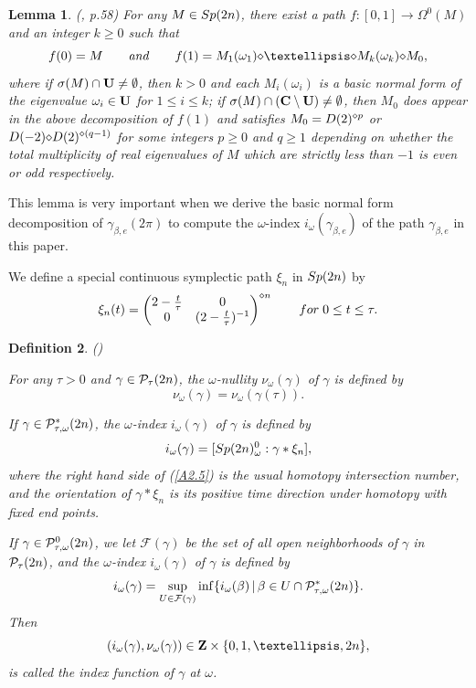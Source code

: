 \documentclass[11pt]{article}
\newtheorem{lemma}{Lemma}[section]
\newtheorem{definition}[lemma]{Definition}
\def\be{\begin{equation}}
\def\ee{\end{equation}}
\def\lb{\label}
\def\bs{\setminus}
\def\C{{\bf C}}
\def\Z{{\bf Z}}
\def\U{{\bf U}}
\def\bb{{\beta}}
\def\ga{{\gamma}}
\def\om{{\omega}}
\def\sg{{\sigma}}
\def\P{{\cal P}}
\def\Sp{{\rm Sp}}
\def\dm{{\rm \diamond}}
\begin{document}
\begin{lemma} (\cite{Lon4}, p.58) For any $M\in\Sp(2n)$, there exist a path $f:[0,1]\to\Omega^0(M)$ and
an integer $k\ge 0$ such that
$$ f(0)=M \qquad {\it and}\qquad f(1)=M_1(\om_1)\dm\ldots\dm M_k(\om_k)\dm M_0, $$
where if $\sg(M)\cap\U\not=\emptyset$, then $k>0$ and each $M_i(\om_i)$ is a basic normal form of the
eigenvalue $\om_i\in\U$ for $1\le i\le k$;
if $\sg(M)\cap (\C\bs\U)\not=\emptyset$, then $M_0$
does appear in the above decomposition of $f(1)$ and satisfies $M_0=D(2)^{\dm p}$ or
$D(-2)\dm D(2)^{\dm(q-1)}$ for some integers $p\ge 0$ and $q\ge 1$ depending on whether the total
multiplicity of real eigenvalues of $M$ which are strictly less than $-1$ is even or odd respectively.
\end{lemma}

This lemma is very important when we derive the basic normal form decomposition of $\ga_{\bb,e}(2\pi)$ to
compute the $\om$-index $i_{\om}(\ga_{\bb,e})$ of the path $\ga_{\bb,e}$ in this paper.

We define a special continuous symplectic path $\xi_n$ in $\Sp(2n)$ by
\be \xi_n(t) = \left(\begin{matrix}2-\frac{t}{\tau} & 0 \cr
                             0 &  (2-\frac{t}{\tau})^{-1}\end{matrix}
               \right)^{\dm n} \qquad {\rm for}\;0\le t\le \tau.  \lb{A2.3}\ee

\begin{definition} (\cite{Lon4})\lb{D2.2} {For any $\tau>0$ and $\ga\in \P_{\tau}(2n)$,
the $\om$-nullity $\nu_{\om}(\ga)$ of $\ga$ is defined by
\be \nu_{\om}(\ga)= \nu_{\om}(\ga(\tau)).  \lb{A2.4}\ee

If $\ga\in\P_{\tau,\om}^{\ast}(2n)$, the $\om$-index $i_{\om}(\ga)$ of $\ga$ is defined by
\be i_{\om}(\ga) = [\Sp(2n)_{\om}^0: \ga\ast\xi_n],  \lb{A2.5}\ee
where the right hand side of (\ref{A2.5}) is the usual homotopy intersection number, and
the orientation of $\ga\ast\xi_n$ is its positive time direction under homotopy with
fixed end points.

If $\ga\in\P_{\tau,\om}^0(2n)$, we let $\mathcal{F}(\ga)$ be the set of all open
neighborhoods of $\ga$ in $\P_{\tau}(2n)$, and the $\om$-index $i_{\om}(\ga)$ of $\ga$ is
defined by
\be i_{\om}(\ga) = \sup_{U\in\mathcal{F}(\ga)}\inf\{i_{\om}(\beta)\,|\,
                       \beta\in U\cap\P_{\tau,\om}^{\ast}(2n)\}.      \lb{A2.6}\ee
Then
$$ (i_{\om}(\ga), \nu_{\om}(\ga)) \in \Z\times \{0,1,\ldots,2n\}, $$
is called the index function of $\ga$ at $\om$. }
\end{definition}
\end{document}
